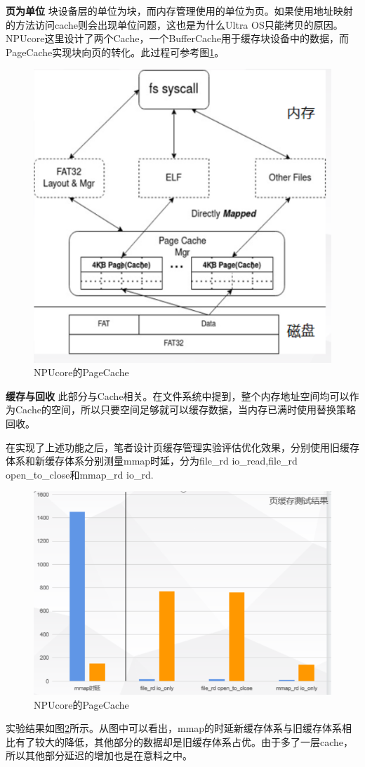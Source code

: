 \textbf{页为单位} \; 块设备层的单位为块，而内存管理使用的单位为页。如果使用地址映射的方法访问cache则会出现单位问题，这也是为什么Ultra OS只能拷贝的原因。NPUcore这里设计了两个Cache，一个BufferCache用于缓存块设备中的数据，而PageCache实现块向页的转化。此过程可参考图\ref{exam-8}。

\begin{figure}[htbp]
	\centering
	\includegraphics[scale=0.6]{figures/10-04/10-04-08.png}
	\caption{NPUcore的PageCache}
	\label{exam-8}
\end{figure}

\textbf{缓存与回收} \; 此部分与Cache相关。在文件系统中提到，整个内存地址空间均可以作为Cache的空间，所以只要空间足够就可以缓存数据，当内存已满时使用替换策略回收。

在实现了上述功能之后，笔者设计页缓存管理实验评估优化效果，分别使用旧缓存体系和新缓存体系分别测量mmap时延，分为file\_rd io\_read,file\_rd open\_to\_close和mmap_rd io\_rd.

\begin{figure}[htbp]
	\centering
	\includegraphics[scale=0.5]{figures/10-04/10-04-09.png}
	\caption{NPUcore的PageCache}
	\label{exam-9}
\end{figure}

实验结果如图\ref{exam-9}所示。从图中可以看出，mmap的时延新缓存体系与旧缓存体系相比有了较大的降低，其他部分的数据却是旧缓存体系占优。由于多了一层cache，所以其他部分延迟的增加也是在意料之中。




